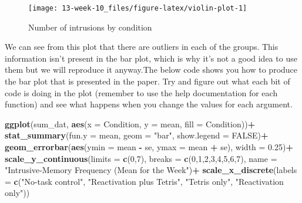 \documentclass[]{book}
\newenvironment{Shaded}{\begin{snugshade}}{\end{snugshade}}
\newcommand{\DataTypeTok}[1]{\textcolor[rgb]{0.13,0.29,0.53}{#1}}
\newcommand{\DecValTok}[1]{\textcolor[rgb]{0.00,0.00,0.81}{#1}}
\newcommand{\FloatTok}[1]{\textcolor[rgb]{0.00,0.00,0.81}{#1}}
\newcommand{\KeywordTok}[1]{\textcolor[rgb]{0.13,0.29,0.53}{\textbf{#1}}}
\newcommand{\NormalTok}[1]{#1}
\newcommand{\OperatorTok}[1]{\textcolor[rgb]{0.81,0.36,0.00}{\textbf{#1}}}
\newcommand{\OtherTok}[1]{\textcolor[rgb]{0.56,0.35,0.01}{#1}}
\newcommand{\StringTok}[1]{\textcolor[rgb]{0.31,0.60,0.02}{#1}}
\begin{document}
\begin{figure}

{\centering \texttt{[image: 13-week-10\_files/figure-latex/violin-plot-1]} 

}

\caption{Number of intrusions by condition}\label{fig:violin-plot}
\end{figure}

We can see from this plot that there are outliers in each of the groups. This information isn't present in the bar plot, which is why it's not a good idea to use them but we will reproduce it anyway.The below code shows you how to produce the bar plot that is presented in the paper. Try and figure out what each bit of code is doing in the plot (remember to use the help documentation for each function) and see what happens when you change the values for each argument.

\begin{Shaded}
\begin{Highlighting}[]
\KeywordTok{ggplot}\NormalTok{(sum_dat, }\KeywordTok{aes}\NormalTok{(}\DataTypeTok{x =}\NormalTok{ Condition, }\DataTypeTok{y =}\NormalTok{ mean, }\DataTypeTok{fill =}\NormalTok{ Condition))}\OperatorTok{+}
\StringTok{  }\KeywordTok{stat_summary}\NormalTok{(}\DataTypeTok{fun.y =}\NormalTok{ mean, }\DataTypeTok{geom =} \StringTok{"bar"}\NormalTok{, }\DataTypeTok{show.legend =} \OtherTok{FALSE}\NormalTok{)}\OperatorTok{+}
\StringTok{  }\KeywordTok{geom_errorbar}\NormalTok{(}\KeywordTok{aes}\NormalTok{(}\DataTypeTok{ymin =}\NormalTok{ mean }\OperatorTok{-}\StringTok{ }\NormalTok{se, }\DataTypeTok{ymax =}\NormalTok{ mean }\OperatorTok{+}\StringTok{ }\NormalTok{se), }\DataTypeTok{width =} \FloatTok{0.25}\NormalTok{)}\OperatorTok{+}
\StringTok{  }\KeywordTok{scale_y_continuous}\NormalTok{(}\DataTypeTok{limits =} \KeywordTok{c}\NormalTok{(}\DecValTok{0}\NormalTok{,}\DecValTok{7}\NormalTok{), }
                     \DataTypeTok{breaks =} \KeywordTok{c}\NormalTok{(}\DecValTok{0}\NormalTok{,}\DecValTok{1}\NormalTok{,}\DecValTok{2}\NormalTok{,}\DecValTok{3}\NormalTok{,}\DecValTok{4}\NormalTok{,}\DecValTok{5}\NormalTok{,}\DecValTok{6}\NormalTok{,}\DecValTok{7}\NormalTok{), }
                     \DataTypeTok{name =} \StringTok{"Intrusive-Memory Frequency (Mean for the Week"}\NormalTok{)}\OperatorTok{+}
\StringTok{  }\KeywordTok{scale_x_discrete}\NormalTok{(}\DataTypeTok{labels =} \KeywordTok{c}\NormalTok{(}\StringTok{"No-task control"}\NormalTok{, }\StringTok{"Reactivation plus Tetris"}\NormalTok{, }\StringTok{"Tetris only"}\NormalTok{,}
                                \StringTok{"Reactivation only"}\NormalTok{))}
\end{Highlighting}
\end{Shaded}
\end{document}

